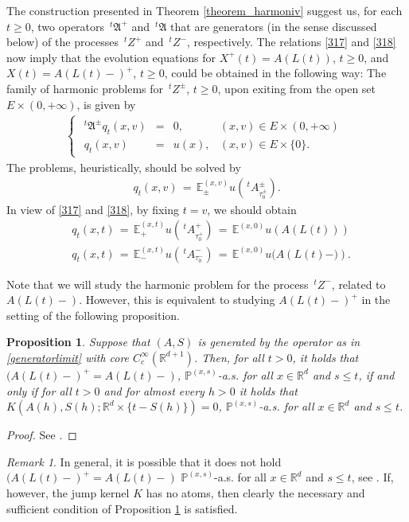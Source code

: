 \documentclass[reqno]{amsart}
\newtheorem{proposition}[theorem]{Proposition}
\theoremstyle{remark}
\newtheorem{remark}[theorem]{Remark}
\numberwithin{equation}{section} %
\newcommand{\R}{\mathbb{R}}
\newcommand{\PP}{\mathds{P}}
\newcommand{\1}{\mathds{1}}
\begin{document}
	
	The construction presented in Theorem \ref{theorem_harmoniv} suggest us, for each $t\ge0$, two operators $\,^t\mathfrak{A}^+$ and $\,^t\mathfrak{A}$ that are generators (in the sense discussed below) of the processes $\,^t Z^+$ and $\,^t Z^-$, respectively. The relations \eqref{317} and \eqref{318} now imply that the evolution equations for $X^+(t)=A(L(t))$, $t\ge0$, and $X(t)=A(L(t)-)^+$, $t\ge0$, could be obtained in the following way:
	The family of harmonic problems for $\,^t Z^\pm$, $t\ge0$, upon exiting from the open set $E \times (0, +\infty)$, is given by
	\begin{align}
		\begin{cases} 
			\begin{array}{rcll}
				^t\mathfrak{A}^{\pm} q_t(x,v)  &=&  0, \qquad &(x,v) \in E \times (0, +\infty) \\
				q_t(x,v) &=& u(x), & (x,v) \in E \times \{ 0 \}.
			\end{array}
		\end{cases}
		\label{1407}
	\end{align}
	The problems, heuristically, should be solved by
	\begin{align}
		q_t(x,v) \, = \, \mathds{E}_{\pm}^{(x,v)} u(\,^tA^{\pm}_{\tau_{0}^{\pm}}).
		\label{1408}
	\end{align}
	In view of \eqref{317} and \eqref{318}, by fixing $t=v$, we should obtain
	\begin{align}
		&     q_t(x,t) \, = \, \mathds{E}_{+}^{(x,t)} u(\, ^tA^{+}_{\tau_{0}^{+}}) \, = \, \mathds{E}^{(x,0)} u(A(L(t))) \label{320}\\ 
		&   q_t(x,t) \, = \, \mathds{E}_{-}^{(x,t)} u(\, ^tA^{-}_{\tau_{0}^{-}}) \, = \, \mathds{E}^{(x,0)} u(A({L(t)-)}).
	\end{align}
	
	Note that we will study the harmonic problem for the process $\,^tZ^-$, related to $A(L(t)-)$. However, this is equivalent to studying $A(L(t)-)^+$ in the setting of the following proposition. 
	\begin{proposition}\label{p:1333}
		Suppose that $(A,S)$ is generated by the operator as in \eqref{generatorlimit} with core $C_c^\infty(\R^{d+1})$.
		Then, for all $t>0$, it holds that $(A(L(t)-)^+=A(L(t)-)$, $\PP^{(x,s)}$-a.s. for all $x\in \R^d$ and $s\le t$, if and only if for all $t>0$ and for almost every $h>0$ it holds that  $K(A(h),S(h);\R^d\times \{t-S(h)\})=0$, $\PP^{(x,s)}$-a.s. for all $x\in \R^d$ and $s\le t$.
	\end{proposition}
	\begin{proof}
		See \cite{biocic2025}.
	\end{proof}
	\begin{remark}
		In general, it is possible that it does not hold $(A(L(t)-)^+=A(L(t)-)$ $\PP^{(x,s)}$-a.s. for all $x\in \R^d$ and $s\le t$, see \cite{biocic2025}. If, however, the jump kernel $K$ has no atoms, then clearly the necessary and sufficient condition of Proposition \ref{p:1333} is satisfied.
	\end{remark}
	
\end{document}
